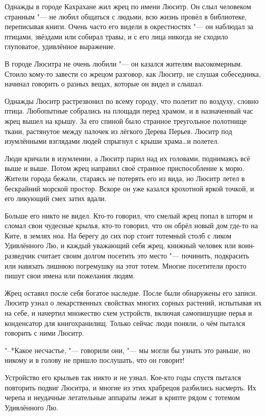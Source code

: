 \documentclass[a4paper,10pt,fleqn]{book}
\begin{document}
Однажды в городе Кахрахане жил жрец по имени Люситр.
Он слыл человеком странным "--- не любил общаться с людьми, всю жизнь провёл в библиотеке, переписывая книги.
Очень часто его видели в окрестностях "--- он наблюдал за птицами, звёздами или собирал травы, и с его лица никогда не сходило глуповатое, удивлённое выражение.

В городе Люситра не очень любили "--- он казался жителям высокомерным.
Стоило кому-то завести со жрецом разговор, как Люситр, не слушая собеседника, начинал говорить о разных вещах, которые он видел и слышал.

Однажды Люситр растрезвонил по всему городу, что полетит по воздуху, словно птица.
Любопытные собрались на площади перед храмом, и в назначенный час жрец вышел на крышу.
За его спиной было странное треугольное полотнище ткани, растянутое между палочек из лёгкого Дерева Перьев.
Люситр под изумлёнными взглядами людей спрыгнул с крыши храма\dots и полетел.

Люди кричали в изумлении, а Люситр парил над их головами, поднимаясь всё выше и выше.
Потом жрец направил своё странное приспособление к морю.
Жители города бежали, стараясь не потерять его из вида, но Люситр летел в бескрайний морской простор.
Вскоре он уже казался крохотной яркой точкой, и его ликующий смех затих вдали.

Больше его никто не видел.
Кто-то говорил, что смелый жрец попал в шторм и сломал свои чудесные крылья, кто-то говорил, что он обрёл новый дом где-то на Ките, в землях ноа.
На берегу до сих пор стоит тотемный столб с ликом Удивлённого Лю, и каждый уважающий себя жрец, книжный человек или воин-разведчик считает своим долгом посетить это место "--- починить, подкрасить или навязать лишнюю погремушку на этот тотем.
Многие посетители просто пишут свои имена или пожелания людям.

Жрец оставил после себя богатое наследие.
После были обнаружены его записи.
Люситр узнал о лекарственных свойствах многих сорных растений, испытывая их на себе, и начертил множество схем устройств, включая самопишущие перья и конденсатор для книгохранилищ.
Только сейчас люди поняли, о чём пытался говорить с ними Люситр.

"--*Какое несчастье, "--- говорили они, "--- мы могли бы узнать это раньше, но никому и в голову не пришло послушать, что он говорит!

Устройство его крыльев так никто и не узнал.
Кое-кто годы спустя пытался повторить подвиг Люситра, и многие из этих храбрецов разбились насмерть.
Их черепа и неудачные летательные аппараты лежат в крипте рядом с тотемом Удивлённого Лю.
\end{document}
